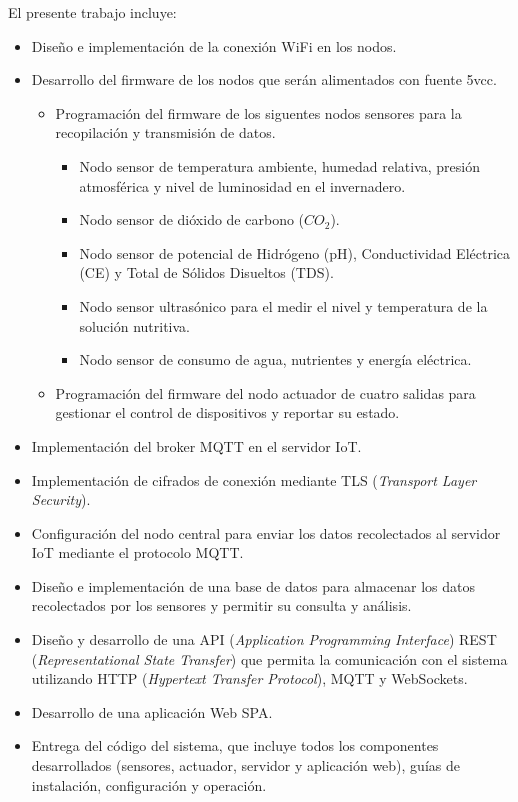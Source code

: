 El presente trabajo incluye:
\begin{itemize}
	\item Diseño e implementación de la conexión WiFi en los nodos.
	\item Desarrollo del firmware de los nodos que serán alimentados con fuente 5vcc.
	      \begin{itemize}
		      \item Programación del firmware de los siguentes nodos sensores para la recopilación
		            y transmisión de datos.
		            \begin{itemize}
			            \item Nodo sensor de temperatura ambiente, humedad relativa, presión atmosférica y nivel de luminosidad en el invernadero.
			            \item Nodo sensor de dióxido de carbono ($CO_2$).
			            \item Nodo sensor de potencial de Hidrógeno (pH), Conductividad Eléctrica (CE) y Total de Sólidos Disueltos (TDS).
			            \item Nodo sensor ultrasónico para el medir el nivel y temperatura de la solución nutritiva.
			            \item Nodo sensor de consumo de agua, nutrientes y energía eléctrica.
		            \end{itemize}
		      \item Programación del firmware del nodo actuador de cuatro salidas para gestionar el
		            control de dispositivos y reportar su estado.
	      \end{itemize}
	\item Implementación del broker MQTT en el servidor IoT.
	\item Implementación de cifrados de conexión mediante TLS (\textit{Transport Layer Security}).
	\item Configuración del nodo central para enviar los datos recolectados al servidor IoT mediante el protocolo MQTT.
	\item Diseño e implementación de una base de datos para almacenar los datos recolectados por los sensores y permitir su consulta y análisis.
	\item Diseño y desarrollo de una API (\textit{Application Programming Interface}) REST (\textit{Representational State Transfer}) que permita 
		  la comunicación con el sistema utilizando HTTP (\textit{Hypertext Transfer Protocol}), MQTT y WebSockets.
	\item Desarrollo de una aplicación Web SPA.
	\item Entrega del código del sistema, que incluye todos los componentes desarrollados (sensores, actuador, servidor y aplicación web), guías de instalación,
	      configuración y operación.
\end{itemize}

